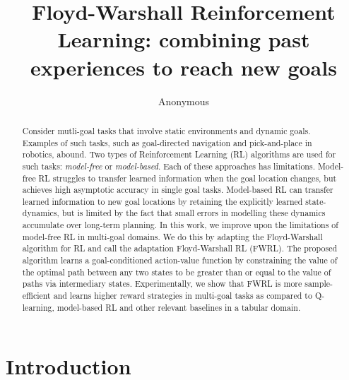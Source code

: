 \documentclass[letterpaper]{article} %
\title{Floyd-Warshall Reinforcement Learning:
  combining past experiences to
reach new goals}
\author{Anonymous}
\begin{document}
\maketitle
\begin{abstract}
Consider mutli-goal tasks that involve static environments and dynamic
goals. Examples of such tasks, such as goal-directed navigation
and pick-and-place in robotics, abound.
Two types of Reinforcement Learning (RL) algorithms are used for
such tasks: 
\emph{model-free} or \emph{model-based}. Each of these approaches has limitations.
Model-free RL struggles to transfer learned information when the goal location
changes, but achieves high asymptotic accuracy in single goal tasks. Model-based
RL can transfer learned information to new goal locations by retaining the
explicitly learned state-dynamics, but is limited by the fact that small errors in
modelling these dynamics accumulate over long-term planning.
In this work, we improve upon the limitations of model-free RL in
multi-goal domains. 
We do this by adapting the Floyd-Warshall algorithm for RL and call the
adaptation Floyd-Warshall RL (FWRL).
The proposed algorithm learns a goal-conditioned action-value function by 
constraining the value of the
optimal path between any two states to be greater than or equal to the value of
paths via intermediary states.
Experimentally, we show that FWRL is more sample-efficient and learns
higher reward strategies in multi-goal tasks as compared to Q-learning, model-based RL 
and other relevant baselines in a tabular domain.



\end{abstract}


\section{ Introduction}



%








\end{document}
